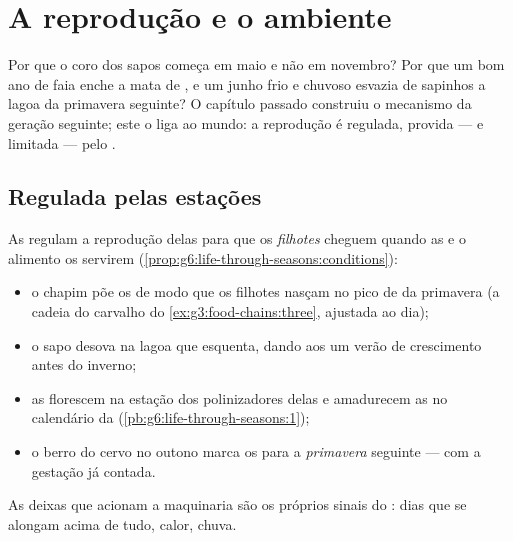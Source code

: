 \chapter{A reprodução e o ambiente}\label{ch:g8:reproduction-and-environment}

Por que o coro dos sapos começa em maio e não em novembro? Por que um
bom ano de faia enche a mata de , e um junho frio e chuvoso
esvazia de sapinhos a lagoa da primavera seguinte? O capítulo passado
construiu o mecanismo da geração seguinte; este o liga ao mundo: a
reprodução é regulada, provida --- e limitada --- pelo .

\section{Regulada pelas estações}

\begin{proposition}\label{prop:g8:reproduction-and-environment:timing}
As  regulam a reprodução delas para que os \emph{filhotes}
cheguem quando as  e o alimento os servirem
(\cref{prop:g6:life-through-seasons:conditions}):
\begin{itemize}
  \item o chapim põe os  de modo que os filhotes nasçam no pico de
         da primavera (a cadeia do carvalho do
        \cref{ex:g3:food-chains:three}, ajustada ao dia);
  \item o sapo desova na lagoa que esquenta, dando aos  um
        verão de crescimento antes do inverno;
  \item as  florescem na estação dos polinizadores delas e
        amadurecem as  no calendário da 
        (\cref{pb:g6:life-through-seasons:1});
  \item o berro do cervo no outono marca os  para a
        \emph{primavera} seguinte --- com a gestação já contada.
\end{itemize}
As deixas que acionam a maquinaria são os próprios sinais do
: dias que se alongam acima de tudo, calor, chuva.
\end{proposition}
\admitted

